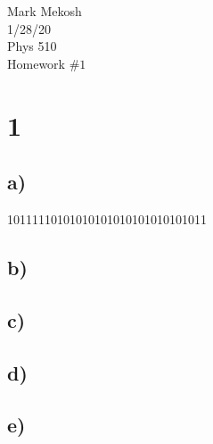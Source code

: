 \documentclass{article}
\newcommand{\homework}[3]{\flushleft Mark Mekosh \\ #1 \\ #2 \\ #3}
\begin{document}
\homework{1/28/20}{Phys 510}{Homework $\#1$}

\section*{1}

	\subsection*{a)}
		10111110101010101010101010101011
	\subsection*{b)}
	
	\subsection*{c)}
	
	\subsection*{d)}
	
	\subsection*{e)}
\end{document}
